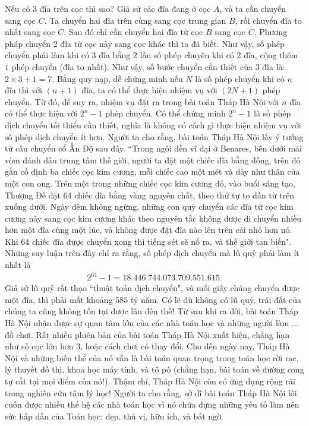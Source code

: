 \begin{multicols}{2}
	\vskip 0.1cm
	Nếu có $3$ đĩa trên cọc thì sao? Giả sử các đĩa đang ở cọc $A$, và ta cần chuyển sang cọc $C$. Ta chuyển hai đĩa trên cùng sang cọc  trung gian $B$, rồi chuyển đĩa to nhất sang cọc $C$. Sau đó chỉ cần chuyển hai đĩa từ cọc $B$ sang cọc $C$. Phương pháp chuyển $2$ đĩa từ cọc này sang cọc khác thì ta đã biết. Như vậy, số phép chuyển phải làm khi có $3$ đĩa bằng $2$ lần số phép chuyên khi có $2$ đĩa, cộng thêm $1$ phép chuyển (đĩa to nhất). 
	\vskip 0.1cm
	Như vậy, số bước chuyển cần thiết của $3$ đĩa là: $2\times 3 + 1 = 7$. Bằng quy nạp, dễ chứng minh nếu $N$ là số phép chuyển khi có $n$ đĩa thì với $(n+1)$ đĩa, ta có thể thực hiện nhiệm vụ với $(2N+1)$ phép chuyển. Từ đó, dễ suy ra, nhiệm vụ đặt ra trong bài toán Tháp Hà Nội với $n$ đĩa có thể thực hiện với $2^n- 1$  phép chuyển.
	\vskip 0.1cm
	Có thể chứng minh $2^n - 1$  là số phép dịch chuyển tối thiểu cần thiết, nghĩa là không có cách gì thực hiện nhiệm vụ với số phép dịch chuyển ít hơn.
	\vskip 0.1cm
	Người ta cho rằng, bài toán Tháp Hà Nội lấy ý tưởng từ câu chuyển cổ Ấn Độ sau đây.
	\vskip 0.1cm
	``Trong ngôi đền vĩ đại ở Benares, bên dưới mái vòm đánh dấu trung tâm thế giới, người ta đặt một chiếc đĩa bằng đồng, trên đó gắn cố định ba chiếc cọc kim cương, mỗi chiếc cao một mét và dày như thân của một con ong. Trên một trong những chiếc cọc  kim cương đó, vào buổi sáng tạo, Thượng Đế đặt $64$ chiếc đĩa bằng vàng nguyên chất, theo thứ tự to dần từ trên xuống dưới.  Ngày đêm không ngừng, những con quỷ chuyển các đĩa từ cọc kim cương này sang cọc kim cương khác theo nguyên tắc không được di chuyển nhiều hơn một đĩa cùng một lúc, và không được đặt đĩa nào lên trên cái nhỏ hơn nó. Khi $64$ chiếc  đĩa  được chuyển xong thì tiếng sét sẽ nổ ra, và thế giới tan biến".
	\vskip 0.1cm
	Những suy luận trên đây chỉ ra rằng, số phép dịch chuyển mà lũ quỷ phải làm ít nhất là
	\begin{align*}
		2^{64} - 1= 18{.}446{.}744{.}073{.}709{.}551{.}615.
	\end{align*}
	Giả sử lũ quỷ rất thạo ``thuật toán dịch chuyển", và mỗi giây chúng chuyển được một đĩa, thì phải mất khoảng $585$ tỷ năm. Có lẽ dù không có lũ quỷ, trái đất của chúng ta cũng không tồn tại được lâu đến thế!
	\vskip 0.1cm
	Từ sau khi ra đời, bài toán Tháp Hà Nội nhận được sự quan tâm lớn của các nhà toán học và những người làm ... đồ chơi. Rất nhiều phiên bản của bài toán Tháp Hà Nội xuất hiện, chẳng hạn như số cọc lớn hơn $3$, hoặc cách chơi có thay đổi. Cho đến ngày nay, Tháp Hà Nội và những biến thể của nó vẫn là bài toán quan trọng trong toán học rời rạc, lý thuyết đồ thị, khoa học máy tính, và tô pô (chẳng hạn, bài toán về đường cong tự cắt tại mọi điểm của nó!). Thậm chí, Tháp Hà Nội còn có ứng dụng rộng rãi trong nghiên cứu tâm lý học!
	\vskip 0.1cm
	Người ta cho rằng, sở dĩ bài toán Tháp Hà Nội lôi cuốn được nhiều thế hệ các nhà toán học vì nó chứa đựng những yếu tố làm nên sức hấp dẫn của Toán học: đẹp, thú vị, hữu ích, và bất ngờ.
\end{multicols}
